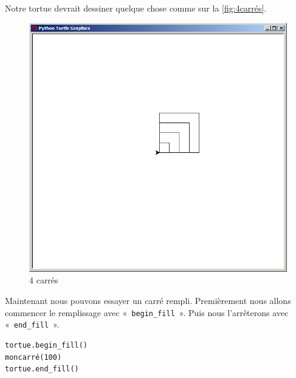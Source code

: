 Notre tortue devrait dessiner quelque chose comme sur la \autoref{fig:4carrés}.

\begin{figure}[h!]
\centering
\includegraphics[scale=0.4]{images/4carres}
\caption{4 carrés}\label{fig:4carrés}
\end{figure}

Maintenant nous pouvons essayer un carré rempli. Premièrement nous allons commencer le remplissage avec
 «~\texttt{begin\_fill}~». Puis nous l'arrêterons avec  «~\texttt{end\_fill}~».

\begin{Verbatim}[frame=single,rulecolor=\color{mbleu}, label=à taper]
tortue.begin_fill()
moncarré(100)
tortue.end_fill()
\end{Verbatim}

